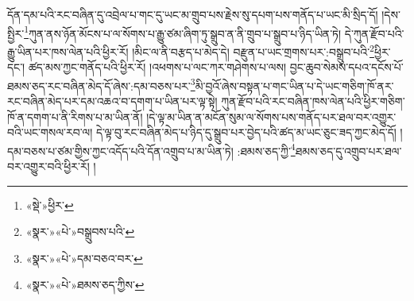 དོན་དམ་པའི་རང་བཞིན་དུ་འབྲེལ་པ་གང་དུ་ཡང་མ་གྲུབ་པས་རྗེས་སུ་དཔག་པས་གནོད་པ་ཡང་མི་སྲིད་དོ། །དེས་སྤྱིར་\footnote{«སྡེ་»ཕྱིར་}ཀུན་ནས་ཉོན་མོངས་པ་ལ་སོགས་པ་རྒྱུ་ཙམ་ཞིག་ཏུ་སྒྲུབ་ན་ནི་གྲུབ་པ་སྒྲུབ་པ་ཉིད་ཡིན་ཏེ། དེ་ཀུན་རྫོབ་པའི་རྒྱུ་ཡིན་པར་ཁས་ལེན་པའི་ཕྱིར་རོ། །མིང་ལ་ནི་བརྩད་པ་མེད་དེ། བརྫུན་པ་ཡང་གྲགས་པར་:བསྒྲུབ་པའི་\footnote{«སྣར་»«པེ་»བསྒྲུབས་པའི་}ཕྱིར་དང་། ཚད་མས་ཀྱང་གནོད་པའི་ཕྱིར་རོ། །འཕགས་པ་ལང་ཀར་གཤེགས་པ་ལས། བྱང་ཆུབ་སེམས་དཔའ་དངོས་པོ་ཐམས་ཅད་རང་བཞིན་མེད་དོ་ཞེས་:དམ་བཅས་པར་\footnote{«སྣར་»«པེ་»དམ་བཅའ་བར་}མི་བྱའོ་ཞེས་བསྟན་པ་གང་ཡིན་པ་དེ་ཡང་གཅིག་ཁོ་ནར་རང་བཞིན་མེད་པར་དམ་འཆའ་བ་དགག་པ་ཡིན་པར་ལྟ་སྟེ། ཀུན་རྫོབ་པའི་རང་བཞིན་ཁས་ལེན་པའི་ཕྱིར་གཅིག་ཁོ་ན་དགག་པ་ནི་རིགས་པ་མ་ཡིན་ནོ། །དེ་ལྟ་མ་ཡིན་ན་མངོན་སུམ་ལ་སོགས་པས་གནོད་པར་ཐལ་བར་འགྱུར་བའི་ཡང་གསལ་རབ་ལ། དེ་ལྟ་བུ་རང་བཞིན་མེད་པ་ཉིད་དུ་སྒྲུབ་པར་བྱེད་པའི་ཚད་མ་ཡང་ཅུང་ཟད་ཀྱང་མེད་དོ། །དམ་བཅས་པ་ཙམ་གྱིས་ཀྱང་འདོད་པའི་དོན་འགྲུབ་པ་མ་ཡིན་ཏེ། :ཐམས་ཅད་ཀྱི་\footnote{«སྣར་»«པེ་»ཐམས་ཅད་ཀྱིས་}ཐམས་ཅད་དུ་འགྲུབ་པར་ཐལ་བར་འགྱུར་བའི་ཕྱིར་རོ། །
